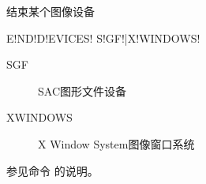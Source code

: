 \label{cmd:enddevices}

结束某个图像设备

\begin{SACSTX}
E!ND!D!EVICES! S!GF!|X!WINDOWS!
\end{SACSTX}

\begin{description}
\item [SGF] SAC图形文件设备
\item [XWINDOWS] X Window System图像窗口系统
\end{description}

参见命令  的说明。

